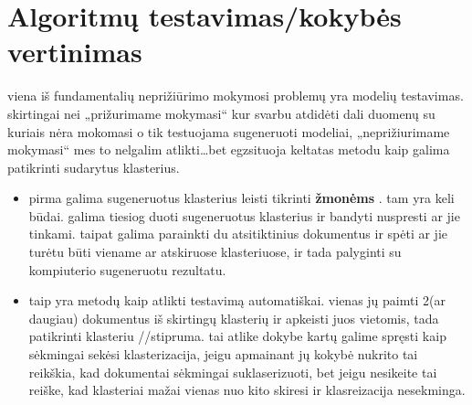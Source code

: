 \documentclass{VUMIFInfKursinis}
\begin{document}
\section{Algoritmų testavimas/kokybės vertinimas}
	viena iš fundamentalių neprižiūrimo mokymosi problemų yra modelių testavimas. skirtingai nei „prižurimame mokymasi“ kur svarbu atdidėti dali duomenų su kuriais nėra mokomasi o tik testuojama sugeneruoti modeliai, „neprižiurimame mokymasi“ mes to nelgalim atlikti\ldots bet egzsituoja keltatas metodu kaip galima patikrinti sudarytus klasterius.
	\begin{itemize}
		\item pirma galima sugeneruotus klasterius leisti tikrinti \textbf{žmonėms }. tam yra keli būdai. galima tiesiog duoti sugeneruotus klasterius ir bandyti nuspresti ar jie tinkami. taipat galima parainkti du atsitiktinius dokumentus ir spėti ar jie turėtu būti viename ar atskiruose klasteriuose, ir tada palyginti su kompiuterio sugeneruotu rezultatu. 
		\item taip yra metodų kaip atlikti testavimą automatiškai. vienas jų paimti 2(ar daugiau) dokumentus iš skirtingų klasterių ir apkeisti juos vietomis, tada patikrinti klasteriu //stipruma. tai atlike dokybe kartų galime spręsti kaip sėkmingai sekėsi klasterizacija, jeigu apmainant jų kokybė nukrito tai reikškia, kad dokumentai sėkmingai suklaserizuoti, bet jeigu nesikeite tai reiške, kad klasteriai mažai vienas nuo kito skiresi ir klasreizacija nesekminga.
	\end{itemize}



\printbibliography[heading=bibintoc] %

\appendix  %
\end{document}
